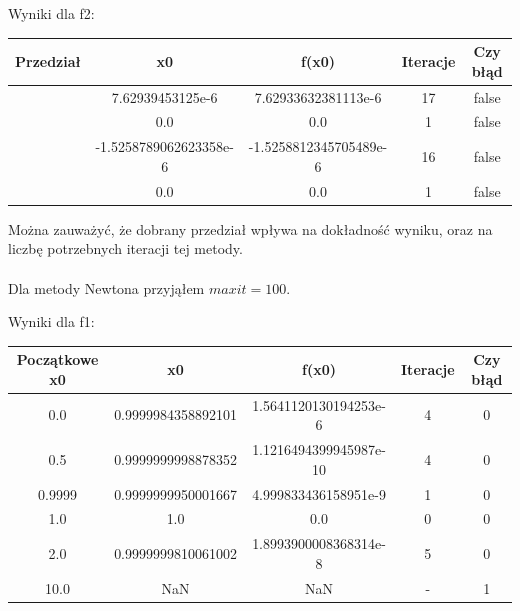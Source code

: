 \documentclass[15pt, a4paper]{article}
\begin{document}
\noindent Wyniki dla f2:
\begin{table}[ht]
\begin{adjustbox}{max width=\textwidth}
\begin{tabular}{|c|c|c|c|c|}
    \hline
    \textbf{Przedział} & \textbf{x0} & \textbf{f(x0)} & \textbf{Iteracje} & \textbf{Czy błąd} \\
    \hline
    [0.0, 1.0] & 7.62939453125e-6 & 7.62933632381113e-6 & 17 & false \\
    \hline
    [-1.0, 1.0] & 0.0 & 0.0 & 1 & false \\
    \hline
    [-0.4, 0.5] & -1.5258789062623358e-6 & -1.5258812345705489e-6 & 16 & false \\
    \hline
    [-0.5, 0.5] & 0.0 & 0.0 & 1 & false \\
    \hline
\end{tabular}
\end{adjustbox}
\end{table}

\noindent Można zauważyć, że dobrany przedział wpływa na dokładność wyniku, oraz na liczbę potrzebnych iteracji tej metody.\\\\

\noindent Dla metody Newtona przyjąłem \(maxit = 100 \).

\noindent Wyniki dla f1:
\begin{table}[ht]
\begin{adjustbox}{max width=\textwidth}
\begin{tabular}{|c|c|c|c|c|}
    \hline
    \textbf{Początkowe x0} & \textbf{x0} & \textbf{f(x0)} & \textbf{Iteracje} & \textbf{Czy błąd} \\
    \hline
    0.0 & 0.9999984358892101 & 1.5641120130194253e-6 & 4 & 0 \\
    \hline
    0.5 & 0.9999999998878352 & 1.1216494399945987e-10 & 4 & 0 \\
    \hline
    0.9999 & 0.9999999950001667 & 4.999833436158951e-9 & 1 & 0 \\
    \hline
    1.0 & 1.0 & 0.0 & 0 & 0 \\
    \hline
    2.0 & 0.9999999810061002 & 1.8993900008368314e-8 & 5 & 0 \\
    \hline
    10.0 & NaN & NaN & - & 1 \\
    \hline
\end{tabular}
\end{adjustbox}
\end{table}
\end{document}
